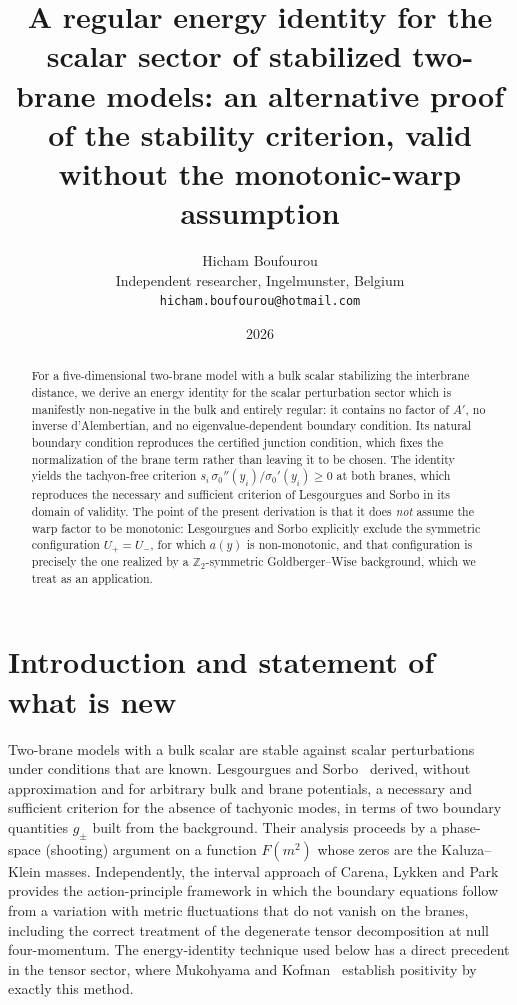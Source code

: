 \documentclass[11pt,a4paper]{article}
\title{A regular energy identity for the scalar sector of stabilized
two-brane models: an alternative proof of the stability criterion,
valid without the monotonic-warp assumption}
\author{Hicham Boufourou\\[2pt]
\small Independent researcher, Ingelmunster, Belgium\\
\small \texttt{hicham.boufourou@hotmail.com}}
\date{2026}
\newcommand{\sig}{\sigma_0}
\begin{document}
\maketitle

\begin{abstract}
For a five-dimensional two-brane model with a bulk scalar stabilizing
the interbrane distance, we derive an energy identity for the scalar
perturbation sector which is manifestly non-negative in the bulk and
entirely regular: it contains no factor of $A'$, no inverse
d'Alembertian, and no eigenvalue-dependent boundary condition. Its
natural boundary condition reproduces the certified junction
condition, which fixes the normalization of the brane term rather than
leaving it to be chosen. The identity yields the tachyon-free
criterion $s_i\,\sig''(y_i)/\sig'(y_i)\ge 0$ at both branes, which
reproduces the necessary and sufficient criterion of Lesgourgues and
Sorbo in its domain of validity. The point of the present derivation
is that it does \emph{not} assume the warp factor to be monotonic:
Lesgourgues and Sorbo explicitly exclude the symmetric configuration
$U_+=U_-$, for which $a(y)$ is non-monotonic, and that configuration
is precisely the one realized by a $\mathbb{Z}_2$-symmetric
Goldberger--Wise background, which we treat as an application.
\end{abstract}

\section{Introduction and statement of what is new}
\label{sec:intro}

Two-brane models with a bulk scalar are stable against scalar
perturbations under conditions that are known. Lesgourgues and
Sorbo~\cite{LS} derived, without approximation and for arbitrary bulk
and brane potentials, a necessary and sufficient criterion for the
absence of tachyonic modes, in terms of two boundary quantities
$g_\pm$ built from the background. Their analysis proceeds by a
phase-space (shooting) argument on a function $F(m^2)$ whose zeros are
the Kaluza--Klein masses. Independently, the interval approach of
Carena, Lykken and Park~\cite{CLP} provides the action-principle
framework in which the boundary equations follow from a variation with
metric fluctuations that do not vanish on the branes, including the
correct treatment of the degenerate tensor decomposition at null
four-momentum. The energy-identity technique used below has a direct
precedent in the tensor sector, where Mukohyama and Kofman~\cite{MK}
establish positivity by exactly this method.
\end{document}
